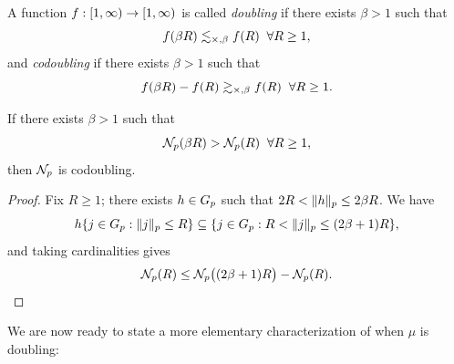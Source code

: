 \begin{definition}
\label{definitiondoubling}
A function $f:[1,\infty)\to[1,\infty)$ is called \emph{doubling} if there exists $\beta > 1$ such that
\begin{equation}
\label{dexp1}
f(\beta R) \lesssim_{\times,\beta} f(R) \;\;\forall R\geq 1,
\end{equation}
and \emph{codoubling} if there exists $\beta > 1$ such that
\begin{equation}
\label{dexp2}
f(\beta R) - f(R) \gtrsim_{\times,\beta} f(R) \;\;\forall R\geq 1.
\end{equation}
\end{definition}

\begin{observation}
\label{observationcodoubling}
If there exists $\beta > 1$ such that
\[
\mathcal N_p(\beta R) > \mathcal N_p(R) \;\;\forall R\geq 1,
\]
then $\mathcal N_p$ is codoubling.
\end{observation}
\begin{proof}
Fix $R\geq 1$; there exists $h\in G_p$ such that $2R < \|h\|_p \leq 2\beta R$. We have
\[
h\{j\in G_p : \|j\|_p \leq R\} \subseteq \{j\in G_p : R < \|j\|_p \leq (2\beta + 1) R\},
\]
and taking cardinalities gives
\[
\mathcal N_p(R) \leq \mathcal N_p\big((2\beta + 1) R\big) - \mathcal N_p(R).
\]
\end{proof}

We are now ready to state a more elementary characterization of when $\mu$ is doubling:

%

